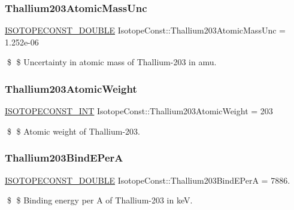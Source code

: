 \subsubsection{\texorpdfstring{Thallium203\+Atomic\+Mass\+Unc}{Thallium203AtomicMassUnc}}
{\footnotesize\ttfamily \mbox{\hyperlink{group___isotope_const-_macros_ga8f45a7272ce02c0b4c65c44636ed719a}{I\+S\+O\+T\+O\+P\+E\+C\+O\+N\+S\+T\+\_\+\+D\+O\+U\+B\+LE}} Isotope\+Const\+::\+Thallium203\+Atomic\+Mass\+Unc = 1.\+252e-\/06}

\$ \$ Uncertainty in atomic mass of Thallium-\/203 in amu. \mbox{\label{group___isotope_const-_thallium-_tl203_ga0f07529f796777ba8b3f31da2cbfef01}} 
\subsubsection{\texorpdfstring{Thallium203\+Atomic\+Weight}{Thallium203AtomicWeight}}
{\footnotesize\ttfamily \mbox{\hyperlink{group___isotope_const-_macros_ga5f18360b3e99483a35c32d789e62621c}{I\+S\+O\+T\+O\+P\+E\+C\+O\+N\+S\+T\+\_\+\+I\+NT}} Isotope\+Const\+::\+Thallium203\+Atomic\+Weight = 203}

\$ \$ Atomic weight of Thallium-\/203. \mbox{\label{group___isotope_const-_thallium-_tl203_gabd17f71c4c5bc7045bd73fb483693260}} 
\subsubsection{\texorpdfstring{Thallium203\+Bind\+E\+PerA}{Thallium203BindEPerA}}
{\footnotesize\ttfamily \mbox{\hyperlink{group___isotope_const-_macros_ga8f45a7272ce02c0b4c65c44636ed719a}{I\+S\+O\+T\+O\+P\+E\+C\+O\+N\+S\+T\+\_\+\+D\+O\+U\+B\+LE}} Isotope\+Const\+::\+Thallium203\+Bind\+E\+PerA = 7886.}

\$ \$ Binding energy per A of Thallium-\/203 in keV. \mbox{\label{group___isotope_const-_thallium-_tl203_ga6581995e062685549cf9cce7bc133ccd}} 
